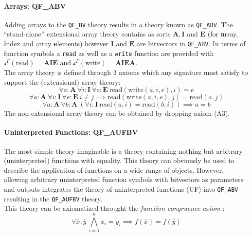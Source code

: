 \paragraph{Arrays: QF\_ABV}
Adding arrays to the \texttt{QF\_BV} theory results in a theory known as \mbox{\texttt{QF\_ABV}}. The \enquote{stand-alone} extensional array theory contains as sorts $\mathbf{A},\mathbf{I}$ and $\mathbf{E}$ (for \textbf{a}rray, \textbf{i}ndex and array \textbf{e}lements) however $\mathbf{I}$ and $\mathbf{E}$ are bitvectors in \texttt{QF\_ABV}. In terms of function symbols a \texttt{read} as well as a \texttt{write} function are provided with $\mathcal{s}^F(\text{read})=\mathbf{A}\mathbf{I}\mathbf{E}$ and $\mathcal{s}^F(\text{write})=\mathbf{A}\mathbf{I}\mathbf{E}\mathbf{A}$.\\
The array theory is defined through 3 axioms which any signature must satisfy to support the (extensional) array theory:
\begin{equation}
    \tag{A1}
    \label{eq:preliminaries:smt:a1}
    \forall a\colon\!\textbf{A}\ \forall i\colon\!\textbf{I}\ \forall e\colon\!\textbf{E}\ 
    \text{read}\left(\text{write}\left(a,i,e\right), i\right) = e
\end{equation}
\begin{equation}
    \tag{A2}
    \label{eq:preliminaries:smt:a2}
    \forall a\colon\!\textbf{A}\ \forall i\colon\!\textbf{I}\ \forall e\colon\!\textbf{E}\ 
    i \neq j \implies \text{read}\left(\text{write}\left(a,i,e\right), j\right)
    = \text{read}\left(a,j\right)
\end{equation}
\begin{equation}
    \tag{A3}
    \label{eq:preliminaries:smt:a3}
    \forall a\colon\!\textbf{A}\ \forall b\colon\!\textbf{A}\ 
    \left( \forall i\colon\!\textbf{I}\ \text{read}\left(a,i\right) = \text{read}\left(b,i\right) \right)
    \implies
    a=b
\end{equation}
The non-extensional array theory can be obtained by dropping axiom (A3).

\paragraph{Uninterpreted Functions: QF\_AUFBV}
The most simple theory imaginable is a theory containing nothing but arbitrary (uninterpreted) functions with equality. This theory can obviously be used to describe the application of functions on a wide range of objects. However, allowing arbitrary uninterpreted function symbols with bitvectors as parameters and outputs integrates the theory of uninterpreted functions (UF) into \texttt{QF\_ABV} resulting in the \texttt{QF\_AUFBV} theory.\\
This theory can be axiomatized throught the \textit{function congruence axiom} \cite{PreinerNiemetzBiere-DIFTS13}:
\begin{equation}
    \tag{EUF}
    \label{eq:preliminaries:smt:euf}
    \forall \bar{x},\bar{y}\ \bigwedge\limits_{i=1}^n x_i=y_i \implies f\left(\bar{x}\right) = f\left(\bar{y}\right)
\end{equation}


